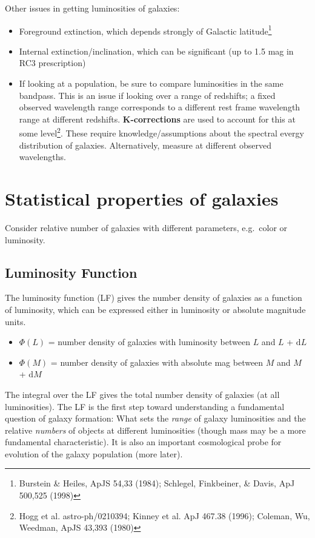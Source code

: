 \documentclass{article}
\begin{document}
Other issues in getting luminosities of galaxies:
\begin{itemize}
    \item Foreground extinction, which depends strongly of Galactic
        latitude\footnote{Burstein \& Heiles, ApJS 54,33 (1984);
        Schlegel, Finkbeiner, \& Davis, ApJ 500,525 (1998)}
    \item Internal extinction/inclination, which can be significant
        (up to 1.5 mag in RC3 prescription)
    \item If looking at a population, be sure to compare luminosities in
        the same bandpass. This is an issue if looking over a range of
        redshifts; a fixed observed wavelength range corresponds to a
        different rest frame wavelength range at different redshifts.
        \textbf{K-corrections} are used to account for this at some
        level\footnote{Hogg et al. astro-ph/0210394; Kinney et al. ApJ
        467.38 (1996); Coleman, Wu, Weedman, ApJS 43,393 (1980)}.
        These require knowledge/assumptions about the spectral evergy
        distribution of galaxies. Alternatively, measure at different
        observed wavelengths.
\end{itemize}

\section{Statistical properties of galaxies}
Consider relative number of galaxies with different parameters,
e.g.\ color or luminosity.
\subsection{Luminosity Function}
The luminosity function (LF) gives the number density of galaxies as a function
of luminosity, which can be expressed either in luminosity or absolute
magnitude units.
\begin{itemize}
    \item $\Phi(L)$ = number density of galaxies with
        luminosity between $L$ and $L$ + $\mathrm{d}L$
    \item $\Phi(M)$ = number density of galaxies with absolute
        mag between $M$ and $M$ + $\mathrm{d}M$
\end{itemize}
The integral over the LF gives the total number density of galaxies (at all
luminosities). The LF is the first step toward understanding a fundamental
question of galaxy formation: What sets the \emph{range} of galaxy luminosities
and the relative \emph{numbers} of objects at different luminosities (though
mass may be a more fundamental characteristic). It is also an important
cosmological probe for evolution of the galaxy population (more later).
\end{document}
